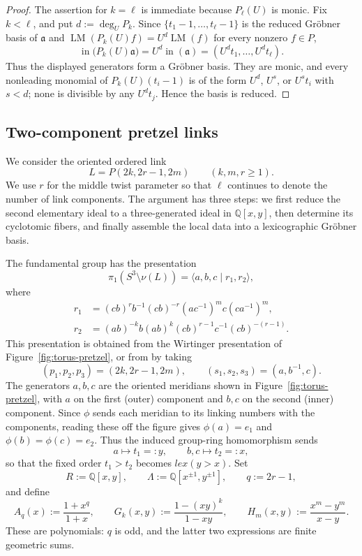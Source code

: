 \documentclass{article}
\theoremstyle{definition}
\theoremstyle{plain}
\newcommand{\Q}{{\mathbb{Q}}}
\newcommand{\lex}{lex}
\DeclareMathOperator{\inop}{in}
\newcommand{\LM}{\operatorname{LM}}
\begin{document}
\begin{proof}
The assertion for \(k=\ell\) is immediate because \(P_\ell(U)\) is
monic.  Fix \(k<\ell\), and put \(d:=\deg_U P_k\).  Since
\(\{t_1-1,\dots,t_\ell-1\}\) is the reduced Gr\"obner basis of
\(\mathfrak a\) and
\(\LM(P_k(U)f)=U^d\LM(f)\) for every nonzero \(f\in P\),
\[
 \inop\bigl(P_k(U)\mathfrak a\bigr)
 =U^d\inop(\mathfrak a)
 =(U^d t_1,\dots,U^d t_\ell).
\]
Thus the displayed generators form a Gr\"obner basis.  They are monic,
and every nonleading monomial of \(P_k(U)(t_i-1)\) is of the form
\(U^d\), \(U^s\), or \(U^s t_i\) with \(s<d\); none is divisible by any
\(U^d t_j\).  Hence the basis is reduced.
\end{proof}




\subsection{Two-component pretzel links}\label{subsec:pretzel-two}

We consider the oriented ordered link
\[
L=P(2k,2r-1,2m)
\qquad (k,m,r\ge 1).
\]
We use \(r\) for the middle twist parameter so that \(\ell\) continues to
denote the number of link components.  The argument has three steps: we
first reduce the second elementary ideal to a three-generated ideal in
\(\Q[x,y]\), then determine its cyclotomic fibers, and finally assemble the
local data into a lexicographic Gr\"obner basis.

The fundamental group has the presentation
\[
\pi_1(S^3\setminus \nu(L))
 =\langle a,b,c\mid r_1,r_2\rangle,
\]
where
\[
\begin{aligned}
r_1&=(cb)^r b^{-1}(cb)^{-r}(ac^{-1})^m c(ca^{-1})^m,\\
r_2&=(ab)^{-k}b(ab)^k(cb)^{r-1}c^{-1}(cb)^{-(r-1)}.
\end{aligned}
\]
This presentation is obtained from the Wirtinger presentation of Figure~\ref{fig:torus-pretzel},
or from
\cite[Proposition~2.1]{Zen} by taking
\[
(p_1,p_2,p_3)=(2k,2r-1,2m),
\qquad
(s_1,s_2,s_3)=(a,b^{-1},c).
\]
The generators \(a,b,c\) are the oriented meridians shown in
Figure~\ref{fig:torus-pretzel}, with \(a\) on the first (outer) component and
\(b,c\) on the second (inner) component.  Since \(\phi\) sends each meridian to
its linking numbers with the components, reading these off the figure gives
\(\phi(a)=e_1\) and \(\phi(b)=\phi(c)=e_2\).
Thus the induced group-ring homomorphism sends
\[
a\longmapsto t_1=:y,
\qquad
b,c\longmapsto t_2=:x,
\]
so that the fixed order \(t_1>t_2\) becomes \(\lex(y>x)\).  Set
\[
R:=\Q[x,y],
\qquad
\Lambda:=\Q[x^{\pm1},y^{\pm1}],
\qquad
q:=2r-1,
\]
and define
\[
A_q(x):=\frac{1+x^q}{1+x},
\qquad
G_k(x,y):=\frac{1-(xy)^k}{1-xy},
\qquad
H_m(x,y):=\frac{x^m-y^m}{x-y}.
\]
These are polynomials: \(q\) is odd, and the latter two expressions are
finite geometric sums.
\end{document}
